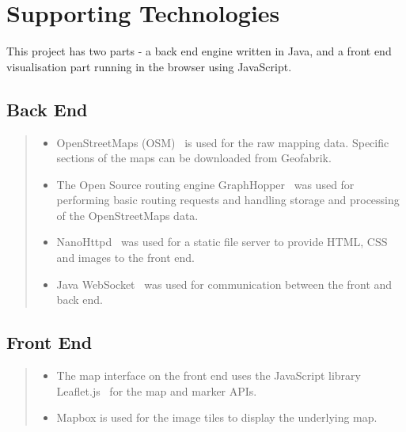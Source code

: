\documentclass[ %
                    author={Alexander Hill},
                supervisor={Dr. Benjamin Sach},
                    degree={MEng},
                     title={MARMOSET},
                  subtitle={Multi-Agent Route Management using Online Simulation for Efficient Transportation},
                      type={research},
                      year={2016} ]{dissertation}
\begin{document}

\chapter*{Supporting Technologies}

\noindent
This project has two parts - a back end engine written in Java, and a front end
visualisation part running in the browser using JavaScript.

\section*{Back End}
\begin{quote}
\noindent
\begin{itemize}
    \item OpenStreetMaps (OSM)~\cite{osm} is used for the raw mapping data. Specific sections of
        the maps can be downloaded from Geofabrik.
    \item The Open Source routing engine GraphHopper~\cite{graphhopper} was
        used for performing basic routing requests and handling storage and
        processing of the OpenStreetMaps data.
    \item NanoHttpd~\cite{nanohttpd} was used for a static file server to
        provide HTML, CSS and images to the front end.
    \item Java WebSocket~\cite{javawebsocket} was used for communication
        between the front and back end.
\end{itemize}
\end{quote}

\section*{Front End}
\begin{quote}
\noindent
\begin{itemize}
    \item The map interface on the front end uses the JavaScript library
    Leaflet.js~\cite{leaflet} for the map and marker APIs.
    \item Mapbox is used for the image tiles to display the underlying map.
\end{itemize}
\end{quote}


\end{document}
